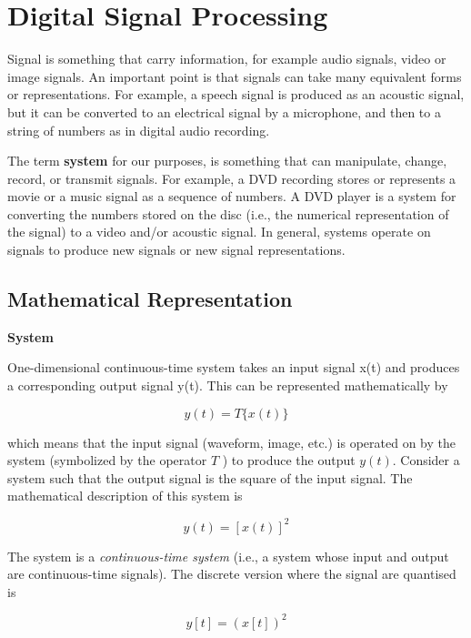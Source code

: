 \documentclass[11pt]{article}
\begin{document}
\section{Digital Signal Processing}

Signal is something that carry information, for example audio signals, video or
image signals. An important point is that signals can take many equivalent forms
or representations. For example, a speech signal is produced as an acoustic
signal, but it can be converted to an electrical signal by a microphone, and
then to a string of numbers as in digital audio recording.

The term \textbf{system} for our purposes, is something that can manipulate,
change, record, or transmit signals. For example, a DVD recording stores or
represents a movie or a music signal as a sequence of numbers. A DVD player is
a system for converting the numbers stored on the disc (i.e., the numerical
representation of the signal) to a video and/or acoustic signal. In general,
systems operate on signals to produce new signals or new signal representations.
\cite{mcclellan2015dsp}

\subsection{Mathematical Representation}

\textbf{System}

One-dimensional continuous-time system takes an input signal x(t) and produces
a corresponding output signal y(t). This can be represented mathematically by

\begin{equation}
  y(t) = T\{x(t)\}
\end{equation}

which means that the input signal (waveform, image, etc.) is operated on by the
system (symbolized by the operator $T$ ) to produce the output $y(t)$. Consider
a system such that the output signal is the square of the input signal. The
mathematical description of this system is

\begin{equation}
  y(t) = [x(t)]^2
\end{equation}

The system is a \textit{continuous-time system} (i.e., a system whose input and
output are continuous-time signals). The discrete version where the signal are
quantised is

\begin{equation}
  y[t] = (x[t])^2
\end{equation}
\end{document}
